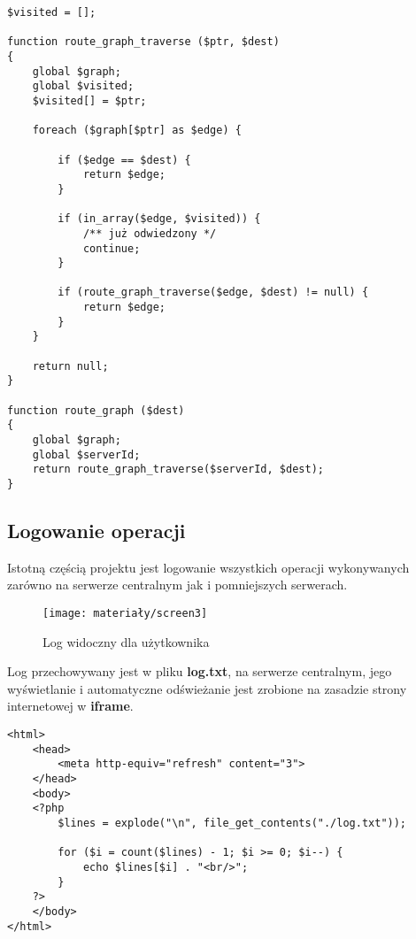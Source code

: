 \begin{empty}
	\begin{verbatim}
$visited = [];

function route_graph_traverse ($ptr, $dest)
{
	global $graph;
	global $visited;
	$visited[] = $ptr;
	
	foreach ($graph[$ptr] as $edge) {
		
		if ($edge == $dest) {
			return $edge;
		}
		
		if (in_array($edge, $visited)) {
			/** już odwiedzony */
			continue;
		}
		
		if (route_graph_traverse($edge, $dest) != null) {
			return $edge;
		}
	}
	
	return null;
}

function route_graph ($dest)
{
	global $graph;
	global $serverId;
	return route_graph_traverse($serverId, $dest);
}
	\end{verbatim}
	\vspace{-10pt}
\end{empty}

\newpage
\subsection{Logowanie operacji}
Istotną częścią projektu jest logowanie wszystkich operacji wykonywanych zarówno na serwerze centralnym jak i pomniejszych serwerach. 

\begin{figure}[H]
	\centering
	\texttt{[image: materiały/screen3]}
	\caption{Log widoczny dla użytkownika}
\end{figure}

Log przechowywany jest w pliku \textbf{log.txt}, na serwerze centralnym, jego wyświetlanie i automatyczne odświeżanie jest zrobione na zasadzie strony internetowej w \textbf{iframe}.

\begin{empty}
	\begin{verbatim}
<html>
	<head>
		<meta http-equiv="refresh" content="3">
	</head>
	<body>
	<?php
		$lines = explode("\n", file_get_contents("./log.txt"));

		for ($i = count($lines) - 1; $i >= 0; $i--) {
			echo $lines[$i] . "<br/>";
		}
	?>
	</body>
</html>
	\end{verbatim}
	\vspace{-10pt}
\end{empty}

